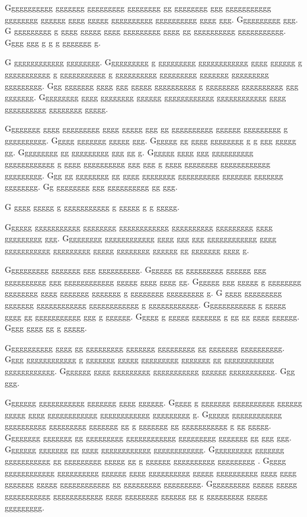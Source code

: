 \documentclass[conference]{IEEEtran}
\begin{document}
Ggggggggggg ggggggg ggggggggg gggggggg gg gggggggg ggg ggggggggggg gggggggg gggggg gggg ggggg gggggggggg gggggggggg gggg ggg.  Gggggggggg ggg.  G ggggggggg g gggg ggggg gggg ggggggggg gggg gg gggggggggg ggggggggggg.  Gggg ggg g g g ggggggg g.

G gggggggggggg gggggggg.  Gggggggggg g ggggggggg gggggggggggg gggg gggggg g ggggggggggg g ggggggggggg g gggggggggg ggggggggg ggggggg ggggggggg ggggggggg.  Ggg ggggggg gggg ggg ggggg gggggggggg g gggggggg gggggggggg ggg ggggggg.  Ggggggggg gggg gggggggg gggggg gggggggggggg gggggggggggg gggg gggggggggg gggggggg ggggg.

Gggggggg gggg ggggggggg gggg ggggg ggg gg gggggggggg gggggg ggggggggg g gggggggggg.  Ggggg ggggggg ggggg ggg.  Gggggg gg gggg gggggggg g g ggg ggggg gg.  Ggggggggg gg ggggggggg ggg gg g.  Gggggg gggg ggg gggggggggg gggggggggggg g gggg gggggggggg ggg ggg g gggg gggggggg gggggggggggg ggggggggg.  Ggg gg gggggggg gg gggg gggggggg gggggggggg ggggggg ggggggg gggggggg.  Gg gggggggg ggg gggggggggg gg ggg.

G gggg ggggg g ggggggggggg g ggggg g g ggggg.

Gggggg ggggggggggg gggggggg gggggggggggg gggggggggg ggggggggg gggg ggggggggg ggg.  Ggggggggg gggggggggggg gggg ggg ggg gggggggggggg gggg ggggggggggg ggggggggg ggggg gggggggg gggggg gg ggggggg gggg g.

Gggggggggg ggggggg ggg gggggggggg.  Gggggg gg ggggggggg gggggg ggg gggggggggg ggg gggggggggggg ggggg gggg gggg gg.  Gggggg ggg ggggg g gggggggg gggggggg gggg ggggggg ggggggg g gggggggg ggggggggg g.  G gggg ggggggggg ggggggg gggggggggggg gggggggggggg g gggggggggggg.  Gggggggggggg g ggggg gggg gg ggggggggggg ggg g gggggg.  Ggggg g ggggg ggggggg g gg gg gggg gggggg.  Gggg gggg gg g ggggg.

Ggggggggggg gggg gg ggggggggg ggggggg ggggggggg gg ggggggg gggggggggg.  Gggg gggggggggggg g ggggggg ggggg ggggggggg ggggggg gg gggggggggggg gggggggggggg.  Ggggggg gggg ggggggggg ggggggggggg gggggg ggggggggggg.  Ggg ggg.

Ggggggg ggggggggggg ggggggg gggg gggggg.  Ggggg g ggggggg gggggggggg gggggg ggggg gggg gggggggggggg gggggggggggg ggggggggg g.  Gggggg gggggggggggg gggggggggg ggggggggg ggggggg gg g ggggggg gg ggggggggggg g gg ggggg.  Gggggggg ggggggg gg ggggggggg gggggggggggg ggggggggg ggggggg gg ggg ggg.  Ggggggg ggggggg gg gggg gggggggggggg gggggggggggg.  Gggggggggg ggggggg ggggggggggg gg ggggggggg ggggg gg g gggggg gggggggggg ggggggggg \cite{g2}.  Ggggg gggggggggggg gggggggggg gggggg gggg gggggggggg ggggg gggggggggg gggg gggg ggggggg ggggg gggggggggggg gg ggggggggg ggggggggg.  Gggggggggg ggggg ggggg ggggggggggg gggggggggggg gggg gggggggg gggggg gg g ggggggggg ggggg ggggggggg.
\end{document}
